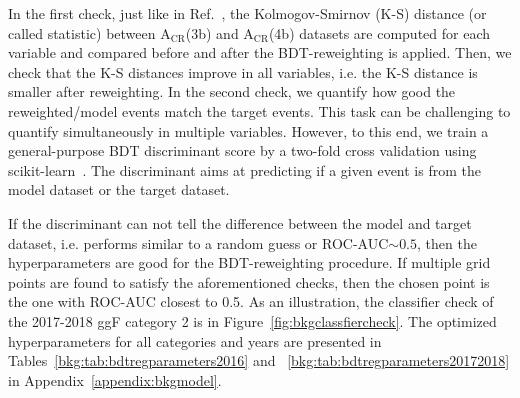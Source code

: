 In the first check, just like in Ref.~\cite{Rogozhnikov:2016bdp}, the Kolmogov-Smirnov (K-S) distance (or called statistic) between $\mathrm{A_{CR}}$(3b) and $\mathrm{A_{CR}}$(4b) datasets are computed for each variable and compared before and after the BDT-reweighting is applied. Then, we check that the K-S distances improve in all variables, i.e. the K-S distance is smaller after reweighting. In the second check, we quantify how good the reweighted/model events match the target events. This task can be challenging to quantify simultaneously in multiple variables. However, to this end, we train a general-purpose BDT discriminant score by a two-fold cross validation using scikit-learn~\cite{scikitlearn}. The discriminant aims at predicting if a given event is from the model dataset or the target dataset.

If the discriminant can not tell the difference between the model and target dataset, i.e. performs similar to a random guess or ROC-AUC$\sim0.5$, then the hyperparameters are good for the BDT-reweighting procedure. If multiple grid points are found to satisfy the aforementioned checks, then the chosen point is the one with ROC-AUC closest to 0.5. As an illustration, the classifier check of the 2017-2018 ggF category 2 is in Figure~\ref{fig:bkgclassfiercheck}. The optimized hyperparameters for all categories and years are presented in Tables~\ref{bkg:tab:bdtregparameters2016} and ~\ref{bkg:tab:bdtregparameters20172018} in Appendix~\ref{appendix:bkgmodel}. 

